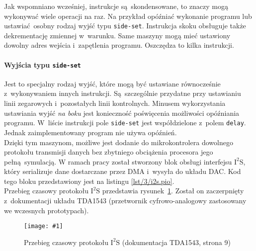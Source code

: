 \documentclass[polish]{aghengthesis}
\newcommand{\imgint}[4]{
	\begin{figure}[{#4}]
		\centering
		\texttt{[image: \#1]}
		\caption{#2}
		\label{#1}
	\end{figure}
}
\newcommand{\imgh}[3]{\imgint{#1}{#2}{#3}{H}}
\newcommand{\isqs}{$\text{I}^{2}\text{S}$}
\newcommand{\sset}{\lstinline|side-set|}
\newcommand{\lstfile}[3]{
	\noindent
	\hspace{0.1\linewidth}
	\begin{minipage}{0.8\linewidth}
		
	\end{minipage}
	\vspace{0.3cm}
}
\begin{document}
			Jak wspomniano wcześniej, instrukcje są skondensowane, to znaczy mogą wykonywać wiele operacji na raz. Na przykład opóźniać wykonanie programu lub ustawiać osobny rodzaj wyjść typu \sset{}.
			Instrukcja skoku obsługuje także dekrementację zmiennej w~warunku. Same maszyny mogą mieć ustawiony dowolny adres wejścia i~zapętlenia programu. Oszczędza to kilka instrukcji.
			
			\paragraph{Wyjścia typu \sset{}}
				Jest to specjalny rodzaj wyjść, które mogą być ustawiane równocześnie z~wykonywaniem innych instrukcji. Są szczególnie przydatne przy ustawianiu linii zegarowych i~pozostałych linii kontrolnych. Minusem wykorzystania ustawiania wyjść \textit{na boku} jest konieczność poświęcenia możliwości opóźniania programu. W~liście instrukcji pole \sset{} jest współdzielone z~polem \lstinline|delay|. Jednak zaimplementowany program nie używa opóźnień.
			$ $\\
			
			Dzięki tym maszynom, możliwe jest dodanie do mikrokontrolera dowolnego protokołu transmisji danych bez zbytniego obciążenia procesora jego pełną symulacją.
			W ramach pracy został stworzony blok obsługi interfejsu \isqs{}, który serializuje dane dostarczane przez DMA i~wysyła do układu DAC. Kod tego bloku przedstawiony jest na listingu \ref{lst/3/i2s.pio}.
			$ $\\
			
			Przebieg czasowy protokołu \isqs{} przedstawia rysunek~\ref{3/pio_i2s_docs}.
			Został on zaczerpnięty z~dokumentacji układu TDA1543 (przetwornik cyfrowo-analogowy zastosowany we wczesnych prototypach).
			\imgh{3/pio_i2s_docs}{Przebieg czasowy protokołu \isqs{} (dokumentacja TDA1543\textsuperscript{\cite{tda_pdf}}, strona 9)}{0.9}
			
			
			\lstfile{pio}{Kod programu \isqs{}}{lst/3/i2s.pio}
			
\end{document}
